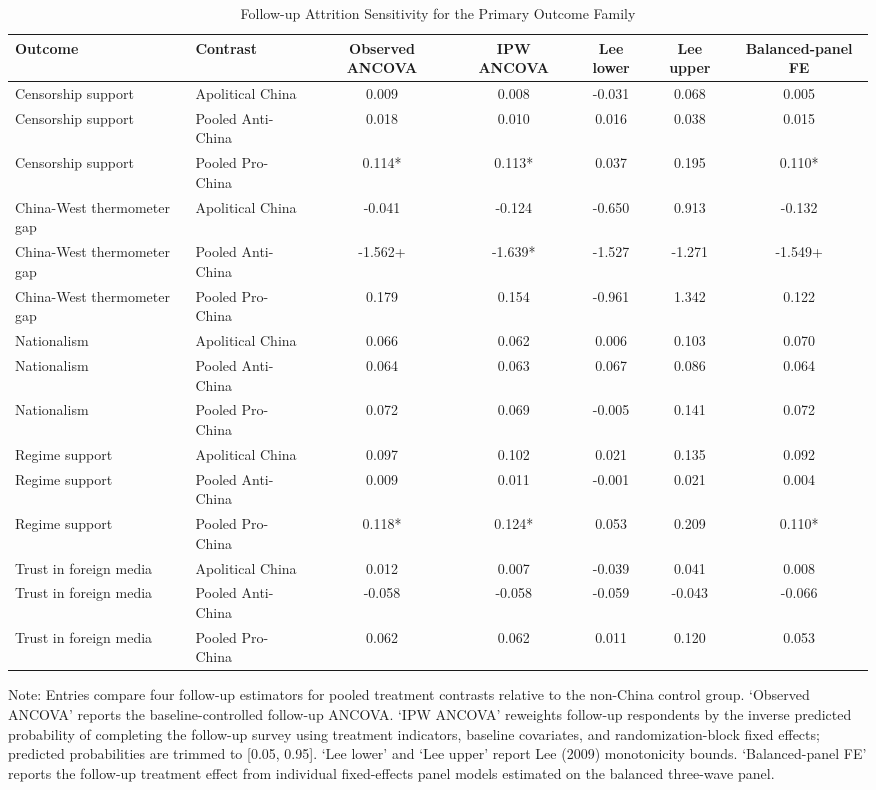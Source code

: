 \begin{table}[H]
\centering
\caption{Follow-up Attrition Sensitivity for the Primary Outcome Family}
\label{tab:t2_attrition_sensitivity}
\footnotesize
\begin{threeparttable}
\begin{tabular}{llccccc}
\toprule
Outcome & Contrast & Observed ANCOVA & IPW ANCOVA & Lee lower & Lee upper & Balanced-panel FE \\
\midrule
Censorship support & Apolitical China & 0.009 & 0.008 & -0.031 & 0.068 & 0.005 \\
Censorship support & Pooled Anti-China & 0.018 & 0.010 & 0.016 & 0.038 & 0.015 \\
Censorship support & Pooled Pro-China & 0.114* & 0.113* & 0.037 & 0.195 & 0.110* \\
China-West thermometer gap & Apolitical China & -0.041 & -0.124 & -0.650 & 0.913 & -0.132 \\
China-West thermometer gap & Pooled Anti-China & -1.562+ & -1.639* & -1.527 & -1.271 & -1.549+ \\
China-West thermometer gap & Pooled Pro-China & 0.179 & 0.154 & -0.961 & 1.342 & 0.122 \\
Nationalism & Apolitical China & 0.066 & 0.062 & 0.006 & 0.103 & 0.070 \\
Nationalism & Pooled Anti-China & 0.064 & 0.063 & 0.067 & 0.086 & 0.064 \\
Nationalism & Pooled Pro-China & 0.072 & 0.069 & -0.005 & 0.141 & 0.072 \\
Regime support & Apolitical China & 0.097 & 0.102 & 0.021 & 0.135 & 0.092 \\
Regime support & Pooled Anti-China & 0.009 & 0.011 & -0.001 & 0.021 & 0.004 \\
Regime support & Pooled Pro-China & 0.118* & 0.124* & 0.053 & 0.209 & 0.110* \\
Trust in foreign media & Apolitical China & 0.012 & 0.007 & -0.039 & 0.041 & 0.008 \\
Trust in foreign media & Pooled Anti-China & -0.058 & -0.058 & -0.059 & -0.043 & -0.066 \\
Trust in foreign media & Pooled Pro-China & 0.062 & 0.062 & 0.011 & 0.120 & 0.053 \\
\bottomrule
\end{tabular}
\begin{tablenotes}[flushleft]
\footnotesize
\item Note: Entries compare four follow-up estimators for pooled treatment contrasts relative to the non-China control group. `Observed ANCOVA' reports the baseline-controlled follow-up ANCOVA. `IPW ANCOVA' reweights follow-up respondents by the inverse predicted probability of completing the follow-up survey using treatment indicators, baseline covariates, and randomization-block fixed effects; predicted probabilities are trimmed to [0.05, 0.95]. `Lee lower' and `Lee upper' report Lee (2009) monotonicity bounds. `Balanced-panel FE' reports the follow-up treatment effect from individual fixed-effects panel models estimated on the balanced three-wave panel.
\end{tablenotes}
\end{threeparttable}
\end{table}
